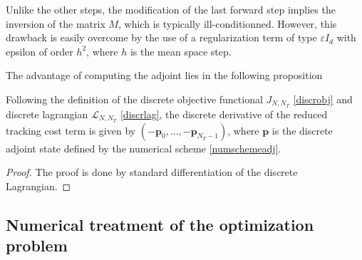  \begin{rmk}
  Unlike the other steps, the modification of the last forward step implies the inversion of the matrix $M$, which is typically ill-conditionned. However, this drawback is easily overcome by the use of a regularization term of type $\varepsilon I_d$ with epsilon of order $h^2$, where $h$ is the mean space step.
 \end{rmk}
 
 The advantage of computing the adjoint lies in the following proposition
 \begin{prop}
 Following the definition of the discrete objective functional $J_{N,N_T}$ \eqref{discrobj} and discrete lagrangian $\mathcal{L}_{N,N_T}$ \eqref{discrlag}, the discrete derivative of the reduced tracking cost term is given by $\left(-\mathbf{p}_0,\ldots,-\mathbf{p}_{N_T-1}\right)$, where $\mathbf{p}$ is the discrete adjoint state defined by the numerical scheme \eqref{numschemeadj}.
 \end{prop}
\begin{proof}
 The proof is done by standard differentiation of the discrete Lagrangian.
\end{proof}


\subsection{Numerical treatment of the optimization problem}
